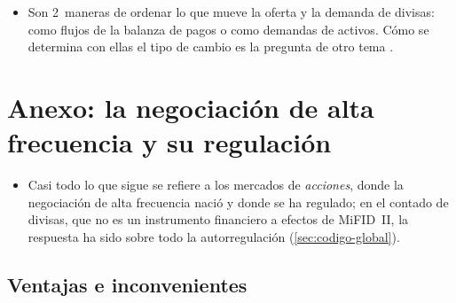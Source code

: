 \documentclass[11pt]{article}
\begin{document}
\begin{itemize}
\item Son 2~maneras de ordenar lo que mueve la oferta y la demanda de divisas: como flujos de la balanza de pagos o como demandas de activos. Cómo se determina con ellas el tipo de cambio es la pregunta de otro tema .
\end{itemize}

\section{Anexo: la negociación de alta frecuencia y su regulación}\label{anexo:alta-frecuencia}

\begin{itemize}
\item Casi todo lo que sigue se refiere a los mercados de \emph{acciones}, donde la negociación de alta frecuencia nació y donde se ha regulado; en el contado de divisas, que no es un instrumento financiero a efectos de MiFID~II, la respuesta ha sido sobre todo la autorregulación (\ref{sec:codigo-global}).
\end{itemize}

\subsection{Ventajas e inconvenientes}
\end{document}
